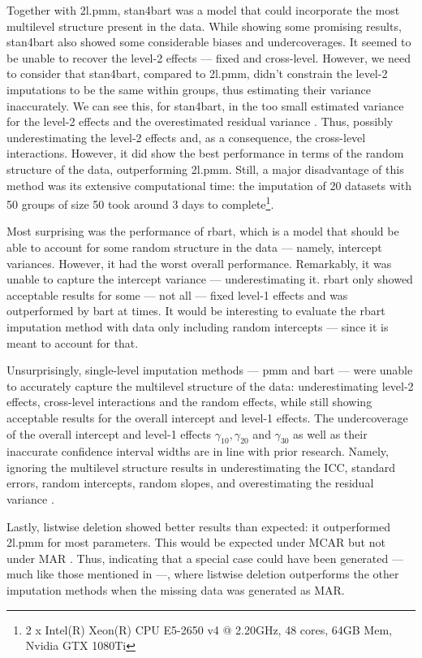 \documentclass[3p,12pt,a4paper]{elsarticle}
\begin{document}
Together with 2l.pmm, stan4bart was a model that could incorporate the most multilevel structure present in the data. While showing some promising results, stan4bart also showed some considerable biases and undercoverages. It seemed to be unable to recover the level-2 effects --- fixed and cross-level. However, we need to consider that stan4bart, compared to 2l.pmm, didn't constrain the level-2 imputations to be the same within groups, thus estimating their variance inaccurately. We can see this, for stan4bart, in the too small estimated variance for the level-2 effects and the overestimated residual variance \citep{buurenFlexibleImputationMissing2018}. Thus, possibly underestimating the level-2 effects and, as a consequence, the cross-level interactions. However, it did show the best performance in terms of the random structure of the data, outperforming 2l.pmm.
Still, a major disadvantage of this method was its extensive computational time: the imputation of 20 datasets with 50 groups of size 50 took around 3 days to complete\footnote{2 x Intel(R) Xeon(R) CPU E5-2650 v4 @ 2.20GHz, 48 cores, 64GB Mem, Nvidia GTX 1080Ti}.

Most surprising was the performance of rbart, which is a model that should be able to account for some random structure in the data --- namely, intercept variances. However, it had the worst overall performance. Remarkably, it was unable to capture the intercept variance --- underestimating it. rbart only showed acceptable results for some --- not all --- fixed level-1 effects and was outperformed by bart at times. It would be interesting to evaluate the rbart imputation method with data only including random intercepts --- since it is meant to account for that.

Unsurprisingly, single-level imputation methods --- pmm and bart --- were unable to accurately capture the multilevel structure of the data: underestimating level-2 effects, cross-level interactions and the random effects, while still showing acceptable results for the overall intercept and level-1 effects. The undercoverage of the overall intercept and level-1 effects $\gamma_{10}, \gamma_{20}$ and $\gamma_{30}$ as well as their inaccurate confidence interval widths are in line with prior research. Namely, ignoring the multilevel structure results in underestimating the ICC, standard errors, random intercepts, random slopes, and overestimating the residual variance \citep{buurenFlexibleImputationMissing2018, ludtke2017, taljaard2008, hox2011,enders2016}.

Lastly, listwise deletion showed better results than expected: it outperformed 2l.pmm for most parameters. This would be expected under MCAR but not under MAR \citep{buurenFlexibleImputationMissing2018,enders2018a,peeters2015,austin2021,carpenter2013,little2002,grund2018,ludtke2017,grund2021,schouten2021}. Thus, indicating that a special case could have been generated --- much like those mentioned in \citep[§2.7]{buurenFlexibleImputationMissing2018} ---, where listwise deletion outperforms the other imputation methods when the missing data was generated as MAR.
\end{document}
